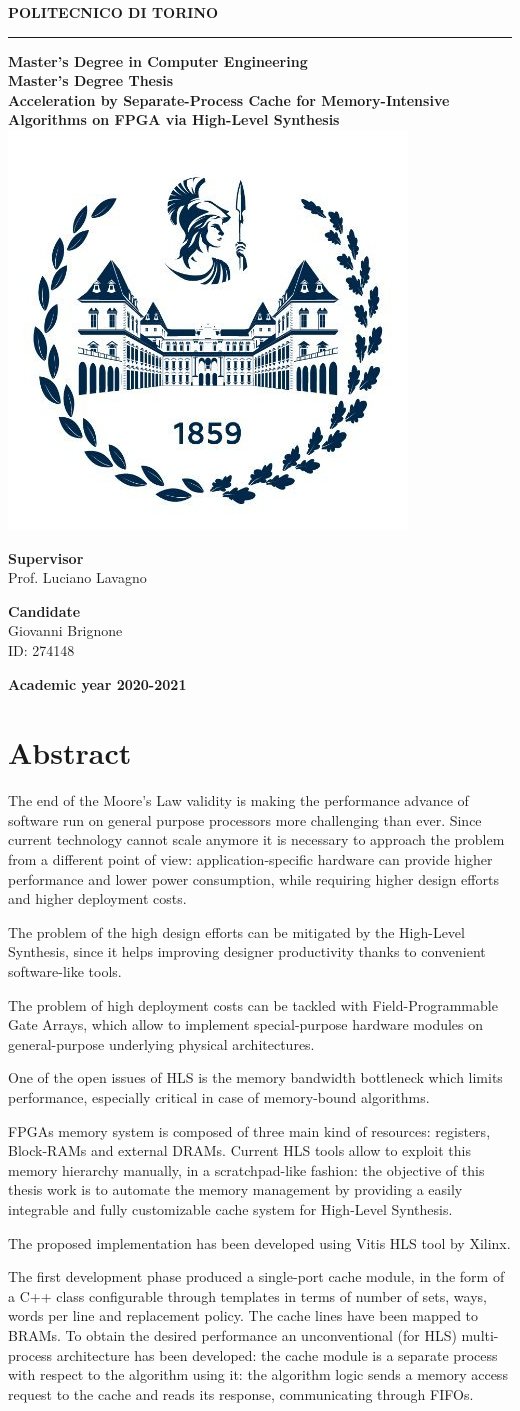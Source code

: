 \documentclass[11pt,a4paper]{memoir}
\renewcommand*{\maketitle}%
{
	\newgeometry{left=2cm,right=2cm,top=3cm,bottom=3.5cm}

	\begin{center}
		\begingroup
		{\Huge\textbf{POLITECNICO DI TORINO}}\\[\baselineskip]
		\rule{\textwidth}{2pt}\par
		\vspace*{1em}
		{\LARGE\textbf{Master's Degree in Computer Engineering}}\\[\baselineskip]
		\vspace*{1em}
		{\Large\textbf{Master's Degree Thesis}}\\
		\vspace*{2cm}
		{\huge\textbf{Acceleration by Separate-Process Cache for
		Memory-Intensive Algorithms on FPGA via High-Level Synthesis}}\\
		\vspace*{1cm}
		\includegraphics[width=.3\textwidth]{figures/polito-logo}
	\end{center}
	\vfill
	\begin{minipage}{0.4\textwidth}
		\begin{flushleft}
			{\Large
				\textbf{Supervisor}\\
				Prof. Luciano Lavagno
			}
		\end{flushleft}
	\end{minipage}
	\begin{minipage}{0.4\textwidth}
		\begin{flushright} 
			{\Large
				\textbf{Candidate}\\
				Giovanni Brignone\\
				ID: 274148
			}
		\end{flushright}
	\end{minipage}  
	\vspace*{2cm}
	\begin{center}
		{\Large\textbf{Academic year 2020-2021}}
	\end{center}
	\endgroup

	\restoregeometry 
}
\begin{document}
\pagestyle{empty}
\maketitle

\frontmatter
\chapter*{Abstract}
The end of the Moore's Law validity is making the performance advance of
software run on general purpose processors more challenging than ever.
Since current technology cannot scale anymore it is necessary to approach the
problem from a different point of view: application-specific hardware can
provide higher performance and lower power consumption, while requiring higher
design efforts and higher deployment costs.

The problem of the high design efforts can be mitigated by the High-Level
Synthesis, since it helps improving designer productivity thanks to convenient
software-like tools.

The problem of high deployment costs can be tackled with Field-Programmable
Gate Arrays, which allow to implement special-purpose hardware modules on
general-purpose underlying physical architectures.

\bigskip
One of the open issues of HLS is the memory bandwidth bottleneck which limits
performance, especially critical in case of memory-bound algorithms.

FPGAs memory system is composed of three main kind of resources: registers,
Block-RAMs and external DRAMs.
Current HLS tools allow to exploit this memory hierarchy manually, in a
scratchpad-like fashion: the objective of this thesis work is to automate the
memory management by providing a easily integrable and fully customizable cache
system for High-Level Synthesis.

\bigskip
The proposed implementation has been developed using Vitis HLS tool by Xilinx.

The first development phase produced a single-port cache module, in the form of
a C++ class configurable through templates in terms of number of sets, ways,
words per line and replacement policy.
The cache lines have been mapped to BRAMs.
To obtain the desired performance an unconventional (for HLS) multi-process
architecture has been developed: the cache module is a separate process with
respect to the algorithm using it: the algorithm logic sends a memory access
request to the cache and reads its response, communicating through FIFOs.
\end{document}
